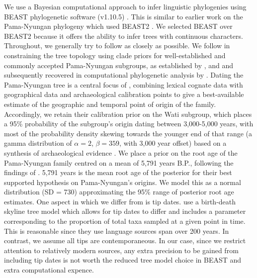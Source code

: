 \documentclass[]{article}
\begin{document}
We use a Bayesian computational approach to infer linguistic phylogenies using BEAST phylogenetic software (v1.10.5) \autocite{suchard_bayesian_2018}. This is similar to earlier work on the Pama-Nyungan phylogeny \autocites{bowern_computational_2012}{bouckaert_origin_2018} which used BEAST2 \autocite{bouckaert_beast_2019}. We selected BEAST over BEAST2 because it offers the ability to infer trees with continuous characters. Throughout, we generally try to follow \textcite{bouckaert_origin_2018} as closely as possible. We follow \textcite{bouckaert_origin_2018} in constraining the tree topology using clade priors for well-established and commonly accepted Pama-Nyungan subgroups, as established by \textcite{ogrady_languages_1966}, \textcite{muhlhausler_atlas_1996} and \textcite{koch_languages_2014} and subsequently recovered in computational phylogenetic analysis by \textcite{bowern_computational_2012}. Dating the Pama-Nyungan tree is a central focus of \textcite{bouckaert_origin_2018}, combining lexical cognate data with geographical data and archaeological calibration points to give a best-available estimate of the geographic and temporal point of origin of the family. Accordingly, we retain their calibration prior on the Wati subgroup, which places a 95\% probability of the subgroup's origin dating between 3,000-5,000 years, with most of the probability density skewing towards the younger end of that range (a gamma distribution of \(\alpha = 2\), \(\beta = 359\), with 3,000 year offset) based on a synthesis of archaeological evidence \autocite[see][p.~746]{bouckaert_origin_2018}. We place a prior on the root age of the Pama-Nyungan family centred on a mean of 5,791 years B.P., following the findings of \textcite{bouckaert_origin_2018}. 5,791 years is the mean root age of the posterior for their best supported hypothesis on Pama-Nyungan's origins. We model this as a normal distribution (SD = 730) approximating the 95\% range of posterior root age estimates. One aspect in which we differ from \textcite{bouckaert_origin_2018} is tip dates. \textcite{bouckaert_origin_2018} use a birth-death skyline tree model which allows for tip dates to differ and includes a parameter corresponding to the proportion of total taxa sampled at a given point in time. This is reasonable since they use language sources span over 200 years. In contrast, we assume all tips are contemporaneous. In our case, since we restrict attention to relatively modern sources, any extra precision to be gained from including tip dates is not worth the reduced tree model choice in BEAST and extra computational expence.
\end{document}
